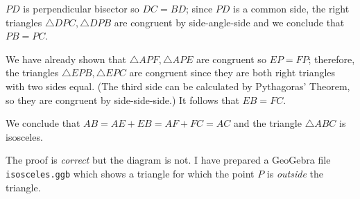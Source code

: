 $PD$ is perpendicular bisector so $DC=BD$; since $PD$ is a common side, the right triangles $\triangle DPC, \triangle DPB$ are congruent by side-angle-side and we conclude that $PB=PC$.

We have already shown that $\triangle APF, \triangle APE$ are congruent so $EP=FP$; therefore, the triangles $\triangle EPB, \triangle EPC$ are congruent since they are both right triangles with two sides equal. (The third side can be calculated by Pythagoras' Theorem, so they are congruent by side-side-side.) It follows that $EB=FC$.

We conclude that $AB= AE+EB=AF+FC =AC$ and the triangle $\triangle ABC$ is isosceles.

The proof is \emph{correct} but the diagram is not. I have prepared a GeoGebra file \texttt{isosceles.ggb} which shows a triangle for which the point $P$ is \emph{outside} the triangle.

